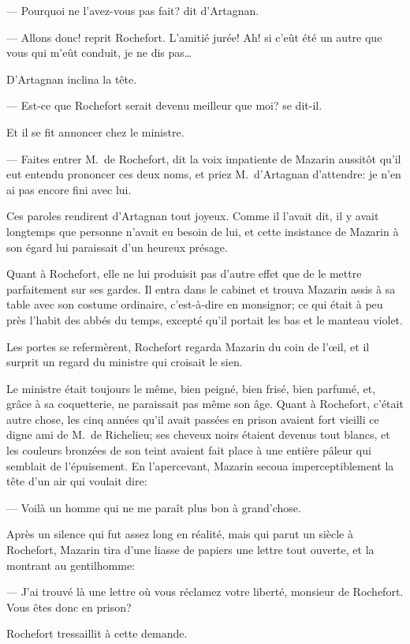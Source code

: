 — Pourquoi ne l'avez-vous pas fait? dit d'Artagnan.

— Allons donc! reprit Rochefort. L'amitié jurée! Ah! si c'eût été un autre que vous qui m'eût conduit, je ne dis pas\dots

D'Artagnan inclina la tête.

— Est-ce que Rochefort serait devenu meilleur que moi? se dit-il.

Et il se fit annoncer chez le ministre.

— Faites entrer M.~de Rochefort, dit la voix impatiente de Mazarin aussitôt qu'il eut entendu prononcer ces deux noms, et priez M.~d'Artagnan d'attendre: je n'en ai pas encore fini avec lui.

Ces paroles rendirent d'Artagnan tout joyeux. Comme il l'avait dit, il y avait longtemps que personne n'avait eu besoin de lui, et cette insistance de Mazarin à son égard lui paraissait d'un heureux présage.

Quant à Rochefort, elle ne lui produisit pas d'autre effet que de le mettre parfaitement sur ses gardes. Il entra dans le cabinet et trouva Mazarin assis à sa table avec son costume ordinaire, c'est-à-dire en monsignor; ce qui était à peu près l'habit des abbés du temps, excepté qu'il portait les bas et le manteau violet.

Les portes se refermèrent, Rochefort regarda Mazarin du coin de l'œil, et il surprit un regard du ministre qui croisait le sien.

Le ministre était toujours le même, bien peigné, bien frisé, bien parfumé, et, grâce à sa coquetterie, ne paraissait pas même son âge. Quant à Rochefort, c'était autre chose, les cinq années qu'il avait passées en prison avaient fort vieilli ce digne ami de M.~de Richelieu; ses cheveux noirs étaient devenus tout blancs, et les couleurs bronzées de son teint avaient fait place à une entière pâleur qui semblait de l'épuisement. En l'apercevant, Mazarin secoua imperceptiblement la tête d'un air qui voulait dire:

— Voilà un homme qui ne me paraît plus bon à grand'chose.

Après un silence qui fut assez long en réalité, mais qui parut un siècle à Rochefort, Mazarin tira d'une liasse de papiers une lettre tout ouverte, et la montrant au gentilhomme:

— J'ai trouvé là une lettre où vous réclamez votre liberté, monsieur de Rochefort. Vous êtes donc en prison?

Rochefort tressaillit à cette demande.

